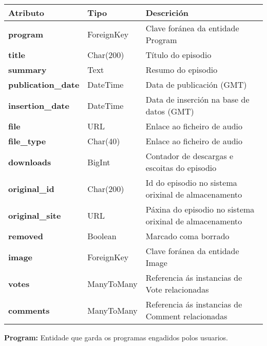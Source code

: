 \begin{tabular}{|p{3cm}|p{3cm}|p{8cm}|} 
	\hline
	Atributo & Tipo & Descrición\\
	\hline
	\textbf{program} & ForeignKey & Clave foránea da entidade Program\\
	\hline
	\textbf{title} & Char(200) & Título do episodio\\	
	\hline
	\textbf{summary} & Text & Resumo do episodio\\
	\hline
	\textbf{publication\_date} & DateTime & Data de publicación (GMT)\\
	\hline
	\textbf{insertion\_date} & DateTime & Data de inserción na base de datos (GMT)\\
	\hline
	\textbf{file} & URL & Enlace ao ficheiro de audio\\
	\hline
	\textbf{file\_type} & Char(40) & Enlace ao ficheiro de audio\\
	\hline
	\textbf{downloads} & BigInt & Contador de descargas e escoitas do episodio\\
	\hline
	\textbf{original\_id} & Char(200) & Id do episodio no sistema orixinal de almacenamento\\
	\hline
	\textbf{original\_site} & URL & Páxina do episodio no sistema orixinal de almacenamento\\
	\hline
	\textbf{removed} & Boolean & Marcado coma borrado\\
	\hline
	\textbf{image} & ForeignKey & Clave foránea da entidade Image\\
	\hline
	\textbf{votes} & ManyToMany & Referencia ás instancias de Vote relacionadas\\
	\hline
	\textbf{comments} & ManyToMany & Referencia ás instancias de Comment relacionadas\\
	\hline
	
\end{tabular}

\textbf{Program:} Entidade que garda os programas engadidos polos usuarios.

